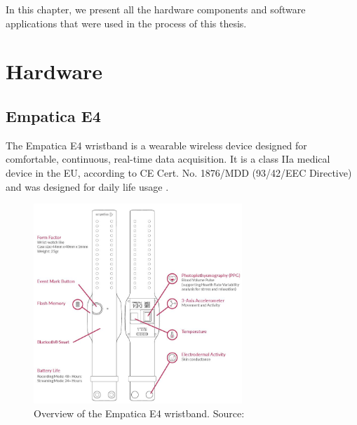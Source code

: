 In this chapter, we present all the hardware components and software applications that were used in the process of this thesis.

\section{Hardware}

\subsection{Empatica E4}\label{e4spec}
The Empatica E4 wristband is a wearable wireless device designed for comfortable, continuous, real-time data acquisition. It is a class IIa medical device in the EU, according to CE Cert. No. 1876/MDD (93/42/EEC Directive) and was designed for daily life usage \cite{e4}.

\begin{figure}[h!]
	\centering
  \includegraphics[width=0.7\textwidth]{images/E4overview.JPG}
	\caption[Overview of the Empatica E4 wristband]{Overview of the Empatica E4 wristband. Source: \cite{e4}}
	\label{e4overview}
\end{figure}

